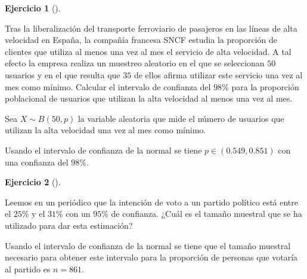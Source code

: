 \documentclass[
  spanish,
  a4paper,
]{scrreport}
\theoremstyle{definition}
\newtheorem{exercise}{Ejercicio}[chapter]
\theoremstyle{remark}
\begin{document}
\begin{exercise}[]\protect\hypertarget{exr-intervalo-confianza-proporción-uso-alta-velocidad}{}\label{exr-intervalo-confianza-proporción-uso-alta-velocidad}

Tras la liberalización del transporte ferroviario de pasajeros en las
líneas de alta velocidad en España, la compañía francesa SNCF estudia la
proporción de clientes que utiliza al menos una vez al mes el servicio
de alta velocidad. A tal efecto la empresa realiza un muestreo aleatorio
en el que se seleccionan \(50\) usuarios y en el que resulta que \(35\)
de ellos afirma utilizar este servicio una vez al mes como mínimo.
Calcular el intervalo de confianza del \(98\)\% para la proporción
poblacional de usuarios que utilizan la alta velocidad al menos una vez
al mes.

\end{exercise}

\begin{tcolorbox}[enhanced jigsaw, arc=.35mm, bottomrule=.15mm, bottomtitle=1mm, breakable, colback=white, colbacktitle=quarto-callout-tip-color!10!white, colframe=quarto-callout-tip-color-frame, coltitle=black, left=2mm, leftrule=.75mm, opacityback=0, opacitybacktitle=0.6, rightrule=.15mm, title=\textcolor{quarto-callout-tip-color}{\faLightbulb}\hspace{0.5em}{Solución}, titlerule=0mm, toprule=.15mm, toptitle=1mm]

Sea \(X\sim B(50, p)\) la variable aleatoria que mide el número de
usuarios que utilizan la alta velocidad una vez al mes como mínimo.

Usando el intervalo de confianza de la normal se tiene
\(p \in (0.549, 0.851)\) con una confianza del \(98\)\%.

\end{tcolorbox}

\begin{exercise}[]\protect\hypertarget{exr-tamaño-muestra-proporción-encuesta}{}\label{exr-tamaño-muestra-proporción-encuesta}

Leemos en un periódico que la intención de voto a un partido político
está entre el \(25\)\% y el \(31\)\% con un \(95\)\% de confianza. ¿Cuál
es el tamaño muestral que se ha utilizado para dar esta estimación?

\end{exercise}

\begin{tcolorbox}[enhanced jigsaw, arc=.35mm, bottomrule=.15mm, bottomtitle=1mm, breakable, colback=white, colbacktitle=quarto-callout-tip-color!10!white, colframe=quarto-callout-tip-color-frame, coltitle=black, left=2mm, leftrule=.75mm, opacityback=0, opacitybacktitle=0.6, rightrule=.15mm, title=\textcolor{quarto-callout-tip-color}{\faLightbulb}\hspace{0.5em}{Solución}, titlerule=0mm, toprule=.15mm, toptitle=1mm]

Usando el intervalo de confianza de la normal se tiene que el tamaño
muestral necesario para obtener este intervalo para la proporción de
personas que votaría al partido es \(n=861\).

\end{tcolorbox}
\end{document}
